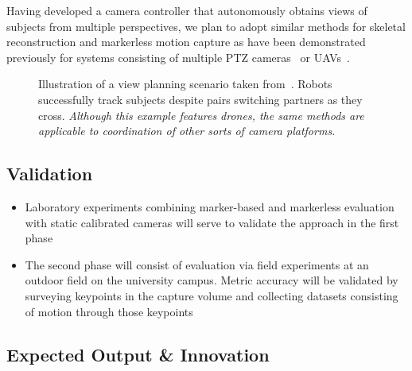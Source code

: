 \documentclass[11pt]{article}
\begin{document}
Having developed a camera controller that autonomously obtains views of subjects
from multiple perspectives, we plan to adopt similar methods for skeletal
reconstruction and markerless motion capture as have been demonstrated
previously for systems consisting of multiple PTZ
cameras~\citep{bachmann20193dv} or
UAVs~\citep{saini2019iccv,ho2021iros,hong2024eccv,saini2022ral}.

\begin{figure}
\centering
\setlength{\tabcolsep}{1pt}
\setlength{\figureheight}{1.2in}
      \resizebox{\linewidth}{!}{
      
      }
      \caption{%
        Illustration of a view planning scenario taken
        from~\citep{hughes2024cdc}.
        Robots successfully track subjects despite pairs switching partners as
        they cross.
        \emph{Although this example features drones, the same methods are
        applicable to coordination of other sorts of camera platforms.}
      }%
      \label{fig:qualitative}
\end{figure}

\subsection{Validation}
\begin{itemize}
  \item Laboratory experiments combining marker-based and markerless evaluation
    with static calibrated cameras will serve to validate the approach in the
    first phase
  \item The second phase will consist of evaluation via field experiments at an
    outdoor field on the university campus.
    Metric accuracy will be validated by surveying keypoints in the capture
    volume and collecting datasets consisting of motion through those keypoints
\end{itemize}

\subsection{Expected Output \& Innovation}
\end{document}
